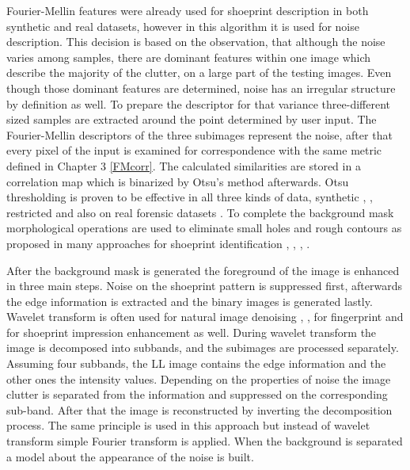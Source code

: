 \documentclass[draft,final]{vutinfth} %
\begin{document}
\par
Fourier-Mellin features were already used for shoeprint description in both synthetic \cite{gueham2008automatic} and real \cite{wu2019crime} datasets, however in this algorithm it is used for noise description.
This decision is based on the observation, that although the noise varies among samples, there are dominant features within one image which describe the majority of the clutter, on a large part of the testing images.
Even though those dominant features are determined, noise has an irregular structure by definition as well.
To prepare the descriptor for that variance three-different sized samples are extracted around the point determined by user input.
The Fourier-Mellin descriptors of the three subimages represent the noise, after that every pixel of the input is examined for correspondence with the same metric defined in Chapter 3 \ref{FMcorr}.
The calculated similarities are stored in a correlation map which is binarized by Otsu's method afterwards.
Otsu thresholding is proven to be effective in all three kinds of data, synthetic \cite{algarni2008novel}, \cite{alizadeh2017automatic}, restricted \cite{kong2014novel} and also on real forensic datasets \cite{wu2019crime}.
To complete the background mask morphological operations are used to eliminate small holes and rough contours as proposed in many approaches for shoeprint identification \cite{wang2014automatic}, \cite{kong2014novel}, \cite{li2014retrieval}, \cite{tang2010footwear}.
\par
After the background mask is generated the foreground of the image is enhanced in three main steps.
Noise on the shoeprint pattern is suppressed first, afterwards the edge information is extracted and the binary images is generated lastly.
Wavelet transform is often used for natural image denoising \cite{xu2016image}, \cite{sugamya2016image}, for fingerprint \cite{li2012texture} and for shoeprint impression enhancement \cite{katireddy2017novel} as well.
During wavelet transform the image is decomposed into subbands, and the subimages are processed separately.
Assuming four subbands, the LL image contains the edge information and the other ones the intensity values.
Depending on the properties of noise the image clutter is separated from the information and suppressed on the corresponding sub-band.
After that the image is reconstructed by inverting the decomposition process.
The same principle is used in this approach but instead of wavelet transform simple Fourier transform is applied.
When the background is separated a model about the appearance of the noise is built.
\end{document}
